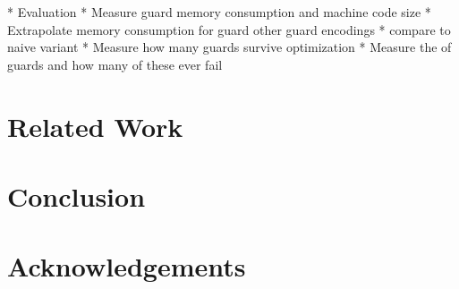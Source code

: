 \documentclass[10pt]{sigplanconf}
\begin{document}
* Evaluation
   * Measure guard memory consumption and machine code size
   * Extrapolate memory consumption for guard other guard encodings
      * compare to naive variant
   * Measure how many guards survive optimization
   * Measure the of guards and how many of these ever fail

\section{Related Work}


\section{Conclusion}


\section*{Acknowledgements}



\end{document}
